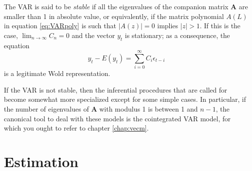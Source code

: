 The VAR is said to be \emph{stable} if all the eigenvalues of the
companion matrix $\mathbf{A}$ are smaller than 1 in absolute value, or
equivalently, if the matrix polynomial $A(L)$ in equation
\eqref{eq:VARpoly} is such that $|A(z)| = 0$ implies $|z|>1$. If this
is the case, $\lim_{n \to \infty} C_n = 0$ and the vector $y_t$ is
stationary; as a consequence, the equation
\begin{equation}
  \label{eq:VMArep}
  y_t - E(y_t) = \sum_{i=0}^{\infty} C_i \epsilon_{t-i}
\end{equation}
is a legitimate Wold representation. 

If the VAR is not stable, then the inferential procedures that are
called for become somewhat more specialized except for some simple
cases. In particular, if the number of eigenvalues of $\mathbf{A}$
with modulus 1 is between 1 and $n-1$, the canonical tool to deal with
these models is the cointegrated VAR model, for which you ought to
refer to chapter \ref{chap:vecm}.

\section{Estimation}
\label{sec:var-estim}

